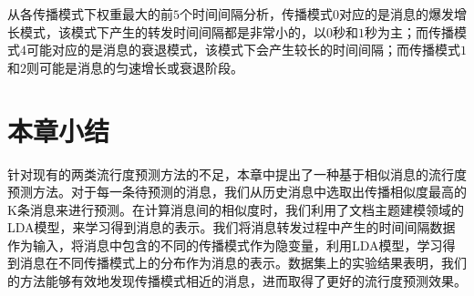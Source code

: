 从各传播模式下权重最大的前$5$个时间间隔分析，传播模式$0$对应的是消息的爆发增长模式，该模式下产生的转发时间间隔都是非常小的，以$0$秒和$1$秒为主；而传播模式$4$可能对应的是消息的衰退模式，该模式下会产生较长的时间间隔；而传播模式$1$和$2$则可能是消息的匀速增长或衰退阶段。
\section{本章小结}
针对现有的两类流行度预测方法的不足，本章中提出了一种基于相似消息的流行度预测方法。对于每一条待预测的消息，我们从历史消息中选取出传播相似度最高的K条消息来进行预测。在计算消息间的相似度时，我们利用了文档主题建模领域的LDA模型，来学习得到消息的表示。我们将消息转发过程中产生的时间间隔数据作为输入，将消息中包含的不同的传播模式作为隐变量，利用LDA模型，学习得到消息在不同传播模式上的分布作为消息的表示。数据集上的实验结果表明，我们的方法能够有效地发现传播模式相近的消息，进而取得了更好的流行度预测效果。
